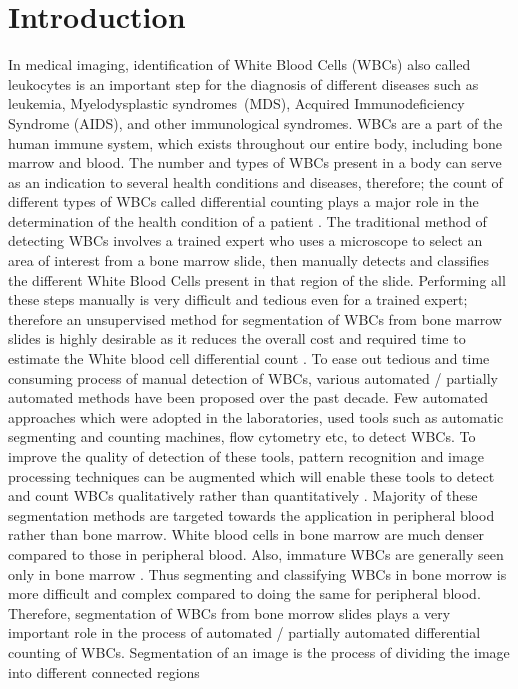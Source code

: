 \documentclass[conference]{IEEEtran}
\begin{document}
\section{Introduction}
In medical imaging, identification of White Blood Cells (WBCs) also called leukocytes is an
important step for the diagnosis of different diseases such as leukemia, Myelodysplastic
syndromes (MDS), Acquired Immunodeficiency Syndrome (AIDS), and other immunological
syndromes. WBCs are a part of the human immune system, which exists throughout our entire
body, including bone marrow and blood. The number and types of WBCs present in a body can
serve as an indication to several health conditions and diseases, therefore; the count of
different types of WBCs called differential counting plays a major role in the determination of
the health condition of a patient \cite{1}. The traditional method of detecting WBCs involves a
trained expert who uses a microscope to select an area of interest from a bone marrow slide,
then manually detects and classifies the different White Blood Cells present in that region of
the slide. Performing all these steps manually is very difficult and tedious even for a trained
expert; therefore an unsupervised method for segmentation of WBCs from bone marrow slides
is highly desirable as it reduces the overall cost and required time to estimate the White blood
cell differential count \cite{2}.
To ease out tedious and time consuming process of manual detection of WBCs, various
automated / partially automated methods have been proposed over the past decade. Few
automated approaches which were adopted in the laboratories, used tools such as automatic
segmenting and counting machines, flow cytometry etc, to detect WBCs. To improve the quality
of detection of these tools, pattern recognition and image processing techniques can be
augmented which will enable these tools to detect and count WBCs qualitatively rather than
quantitatively \cite{3} \cite{4}. Majority of these segmentation methods are targeted towards the
application in peripheral blood rather than bone marrow. White blood cells in bone marrow are
much denser compared to those in peripheral blood. Also, immature WBCs are generally seen
only in bone marrow \cite{5}. Thus segmenting and classifying WBCs in bone morrow is more
difficult and complex compared to doing the same for peripheral blood. Therefore,
segmentation of WBCs from bone morrow slides plays a very important role in the process of
automated / partially automated differential counting of WBCs.
Segmentation of an image is the process of dividing the image into different connected regions
\end{document}
